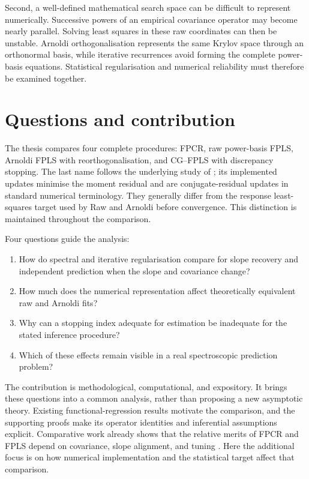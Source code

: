 Second, a well-defined mathematical search space can be difficult to
represent numerically. Successive powers of an empirical covariance operator
may become nearly parallel. Solving least squares in these raw coordinates
can then be unstable. Arnoldi orthogonalisation represents the same Krylov
space through an orthonormal basis, while iterative recurrences avoid forming
the complete power-basis equations. Statistical regularisation and numerical
reliability must therefore be examined together.

\section{Questions and contribution}

The thesis compares four complete procedures: FPCR, raw power-basis FPLS,
Arnoldi FPLS with reorthogonalisation, and CG--FPLS with discrepancy stopping.
The last name follows the underlying study of
\textcite{babii_carrasco_tsafack_2026}; its implemented updates minimise
the moment residual and are conjugate-residual updates in standard numerical
terminology. They generally differ from the response least-squares target
used by Raw and Arnoldi before convergence. This distinction is maintained
throughout the comparison.

Four questions guide the analysis:
\begin{enumerate}
    \item How do spectral and iterative regularisation compare for slope
    recovery and independent prediction when the slope and covariance change?
    \item How much does the numerical representation affect theoretically
    equivalent raw and Arnoldi fits?
    \item Why can a stopping index adequate for estimation be inadequate
    for the stated inference procedure?
    \item Which of these effects remain visible in a real spectroscopic
    prediction problem?
\end{enumerate}

The contribution is methodological, computational, and expository. It brings
these questions into a common analysis, rather than proposing a new
asymptotic theory. Existing functional-regression results motivate the
comparison, and the supporting proofs make its operator identities and
inferential assumptions explicit. Comparative work already shows that the
relative merits of FPCR and FPLS depend on covariance, slope alignment, and
tuning \parencite{febrero_bande_et_al_2017}. Here the additional focus is on
how numerical implementation and the statistical target affect that comparison.

